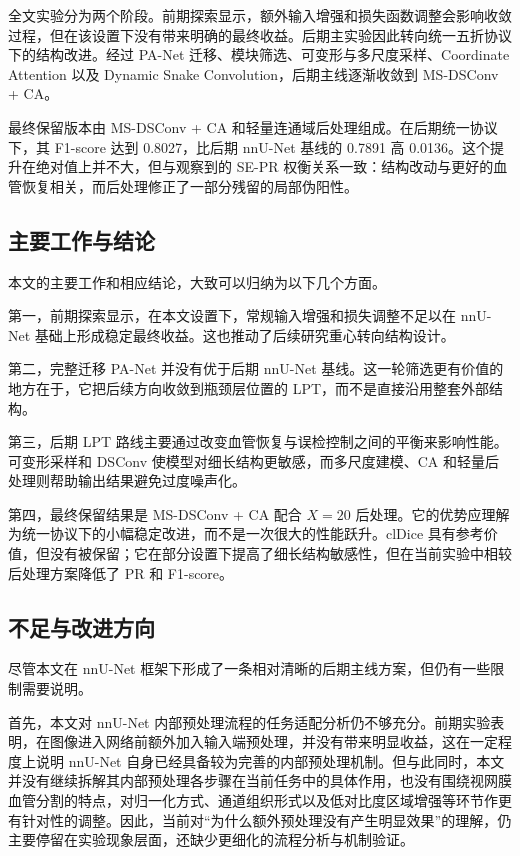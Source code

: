 \documentclass[a4paper,12pt]{article}
\begin{document}
全文实验分为两个阶段。前期探索显示，额外输入增强和损失函数调整会影响收敛过程，但在该设置下没有带来明确的最终收益。后期主实验因此转向统一五折协议下的结构改进。经过 PA-Net 迁移、模块筛选、可变形与多尺度采样、Coordinate Attention 以及 Dynamic Snake Convolution，后期主线逐渐收敛到 MS-DSConv + CA。

最终保留版本由 MS-DSConv + CA 和轻量连通域后处理组成。在后期统一协议下，其 F1-score 达到 0.8027，比后期 nnU-Net 基线的 0.7891 高 0.0136。这个提升在绝对值上并不大，但与观察到的 SE-PR 权衡关系一致：结构改动与更好的血管恢复相关，而后处理修正了一部分残留的局部伪阳性。

\subsection{主要工作与结论}
本文的主要工作和相应结论，大致可以归纳为以下几个方面。

第一，前期探索显示，在本文设置下，常规输入增强和损失调整不足以在 nnU-Net 基础上形成稳定最终收益。这也推动了后续研究重心转向结构设计。

第二，完整迁移 PA-Net 并没有优于后期 nnU-Net 基线。这一轮筛选更有价值的地方在于，它把后续方向收敛到瓶颈层位置的 LPT，而不是直接沿用整套外部结构。

第三，后期 LPT 路线主要通过改变血管恢复与误检控制之间的平衡来影响性能。可变形采样和 DSConv 使模型对细长结构更敏感，而多尺度建模、CA 和轻量后处理则帮助输出结果避免过度噪声化。

第四，最终保留结果是 MS-DSConv + CA 配合 \(X=20\) 后处理。它的优势应理解为统一协议下的小幅稳定改进，而不是一次很大的性能跃升。clDice 具有参考价值，但没有被保留；它在部分设置下提高了细长结构敏感性，但在当前实验中相较后处理方案降低了 PR 和 F1-score。

\subsection{不足与改进方向}
尽管本文在 nnU-Net 框架下形成了一条相对清晰的后期主线方案，但仍有一些限制需要说明。

首先，本文对 nnU-Net 内部预处理流程的任务适配分析仍不够充分。前期实验表明，在图像进入网络前额外加入输入端预处理，并没有带来明显收益，这在一定程度上说明 nnU-Net 自身已经具备较为完善的内部预处理机制。但与此同时，本文并没有继续拆解其内部预处理各步骤在当前任务中的具体作用，也没有围绕视网膜血管分割的特点，对归一化方式、通道组织形式以及低对比度区域增强等环节作更有针对性的调整。因此，当前对“为什么额外预处理没有产生明显效果”的理解，仍主要停留在实验现象层面，还缺少更细化的流程分析与机制验证。
\end{document}
